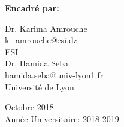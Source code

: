 \begin{titlepage}
\begin{center}
\begin{multicols}{2}
	\end{multicols} 
	
	\vskip 0.1in

	 \textbf{Encadré par:}\\
	 
	 \begin{multicols}{2}
			\Large 	Dr. Karima Amrouche\\
			\large k\_amrouche@esi.dz\\
			ESI\\
		\columnbreak
 			\Large Dr. Hamida Seba\\
			\large hamida.seba@univ-lyon1.fr\\
			Université de Lyon \\
	\end{multicols}
	
	
	\small
	\vskip 0.3in
	Octobre 2018 \\
	Année Universitaire: 2018-2019\\
	
	\end{center}		
\restoregeometry
\end{titlepage}